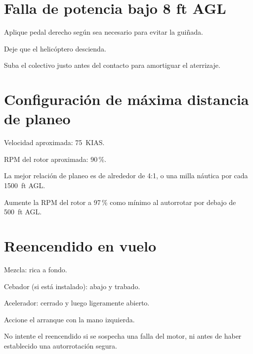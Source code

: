 \section{Falla de potencia bajo 8 ft AGL}

\begin{pasos}
\item Aplique pedal derecho según sea necesario para evitar la guiñada.
\item Deje que el helicóptero descienda.
\item Suba el colectivo justo antes del contacto para amortiguar el aterrizaje.
\end{pasos}

\section{Configuración de máxima distancia de planeo}
\label{sec:planeo-max}

\begin{pasos}
\item Velocidad aproximada: 75~KIAS.
\item RPM del rotor aproximada: 90\,\%.
\item La mejor relación de planeo es de alrededor de 4:1, o una milla náutica por cada 1500~ft AGL.
\end{pasos}

\begin{precaucion}
Aumente la RPM del rotor a 97\,\% como mínimo al autorrotar por debajo de 500~ft AGL.
\end{precaucion}

\section{Reencendido en vuelo}

\begin{pasos}
\item Mezcla: rica a fondo.
\item Cebador (si está instalado): abajo y trabado.
\item Acelerador: cerrado y luego ligeramente abierto.
\item Accione el arranque con la mano izquierda.
\end{pasos}

\begin{precaucion}
No intente el reencendido si se sospecha una falla del motor, ni antes de haber establecido una autorrotación segura.
\end{precaucion}

